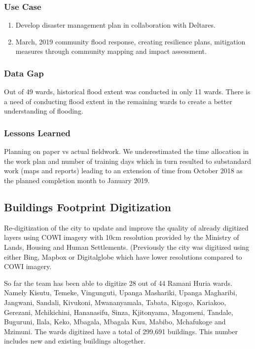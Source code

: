 \documentclass[a4paper,12pt,twoside]{article}
\begin{document}
\subsubsection{Use Case}
\begin{enumerate}
    \item Develop disaster management plan in collaboration with Deltares.
    \item March, 2019 community flood response, creating resilience plans, mitigation measures through community mapping and impact assessment.
\end{enumerate}


\subsubsection{Data Gap}
Out of 49 wards, historical flood extent was conducted in only 11 wards. There is a need of conducting flood extent in the remaining wards to create a better understanding of flooding.

\subsubsection{Lessons Learned}
Planning on paper vs actual fieldwork. We underestimated the time allocation in the work plan and number of training days which in turn resulted to substandard work (maps and reports) leading to an extension of time from October 2018 as the planned completion month to January 2019.

\newpage
\subsection{Buildings Footprint Digitization}
\begin{multicols}{2}
Re-digitization of the city to update and improve the quality of already digitized layers using COWI imagery with 10cm resolution provided by the Ministry of Lands, Housing and Human Settlements. (Previously the city was digitized using either Bing, Mapbox or Digitalglobe which have lower resolutions compared to COWI imagery. 

So far the team has been able to digitize 28 out of 44 Ramani Huria wards. Namely Kisutu, Temeke, Vingunguti, Upanga Mashariki, Upanga Magharibi, Jangwani, Sandali, Kivukoni, Mwananyamala, Tabata, Kigogo, Kariakoo, Gerezani, Mchikichini, Hananasifu, Sinza, Kjitonyama, Magomeni, Tandale, Buguruni, Ilala, Keko, Mbagala, Mbagala Kuu, Mabibo, Mchafukoge and Mzimuni. The wards digitized have a total of 299,691 buildings. This number includes new and existing buildings altogether.
\end{multicols}
\end{document}
